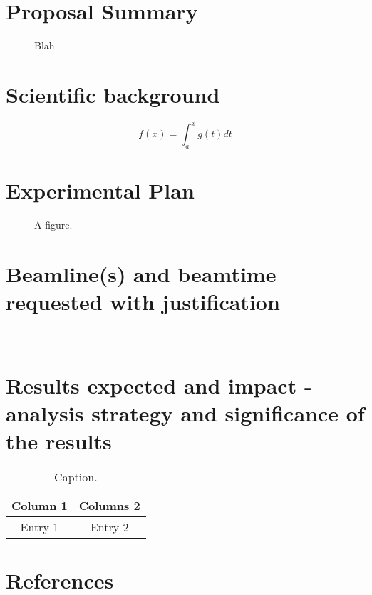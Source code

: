 \documentclass[12pt, oneside, openleft, draft]{esrfstd}
\begin{document}
\maketitle

\section{Proposal Summary}
\begin{wrapfigure}{r}{0.25\textwidth}
	\centering
	\caption{Blah}
	\label{fig:todo}
\end{wrapfigure}
\lipsum[1]

\section{Scientific background}
\lipsum[1]
\begin{equation}
	f(x) = \int_{a}^{x} g(t) dt
\end{equation}

\section{Experimental Plan}
\lipsum[1]
\begin{figure}[h!]
	\centering
	\caption{A figure.}
\end{figure}

\section{Beamline(s) and beamtime requested with justification}
\lipsum[1]~\cite{dummy_paper, dummy_paper2, dummy_paper3}

\section{Results expected and impact - analysis strategy and significance of the results}
\lipsum[1]
\begin{table}[h!]
	\centering
	\caption{Caption.}
	\begin{tabular}{cc}
		\toprule
		Column 1  & Columns 2\\
		\midrule
		Entry 1 & Entry 2\\
		\bottomrule
	\end{tabular}   
	\label{tab:tab1}
\end{table}

\section{References}
\printbibliography[heading=none]
\end{document}
